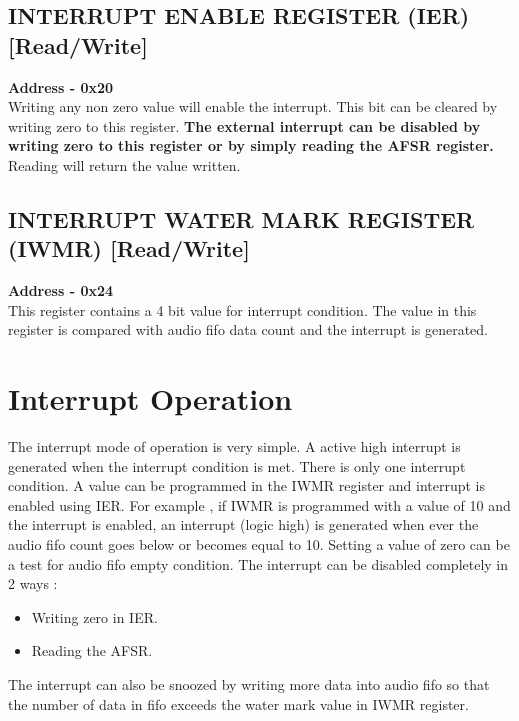 \documentclass[12pt,a4paper]{report}
\begin{document}
\subsection{INTERRUPT ENABLE REGISTER (IER) [Read/Write] }
\hspace{1.6cm}
\textbf{Address - 0x20}
\\
Writing any non zero value will enable the interrupt. This bit can be cleared by writing zero to this register. \textbf{The external interrupt can be disabled by writing zero to this register or by simply reading the AFSR register.}
Reading will return the value written.


\subsection{INTERRUPT WATER MARK REGISTER (IWMR) [Read/Write] }
\hspace{1.6cm}
\textbf{Address - 0x24}
\\
This register contains a 4 bit value for interrupt condition. The value in this register is compared with audio fifo data count and the interrupt is generated.


\section{Interrupt Operation}

The interrupt mode of operation is very simple. A active high interrupt is generated when the interrupt condition is met. There is only one interrupt condition. A value can be programmed in the IWMR register and interrupt is enabled using IER.
For example , if IWMR is programmed with a value of 10 and the interrupt is enabled, an interrupt (logic high) is generated when ever the audio fifo count goes below or becomes equal to 10. Setting a value of zero can be a test for audio fifo empty condition.
The interrupt can be disabled completely in 2 ways :
\begin{itemize}
\item Writing zero in IER.
\item Reading the AFSR.
\end{itemize}

The interrupt can also be snoozed by writing more data into audio fifo so that the number of data in fifo exceeds the water mark value in IWMR register.
\end{document}
